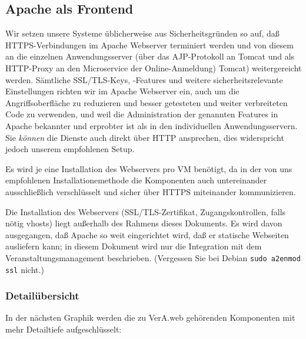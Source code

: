 \fi%

\subsection{Apache als Frontend}\label{subsec:intro-apache}

Wir setzen unsere Systeme üblicherweise aus Sicherheitsgründen so auf,
daß HTTPS-Verbindungen im Apache Webserver terminiert werden und von
diesem an die einzelnen Anwendungsserver (über das AJP-Protokoll an
\ifoa
Tomcat und als HTTP-Proxy an den Microservice der Online-Anmeldung)
\else%
Tomcat)
\fi%
weitergereicht werden. Sämtliche SSL/TLS-Keys, -Features und weitere
sicherheitsrelevante Einstellungen richten wir im Apache Webserver ein,
auch um die Angriffsoberfläche zu reduzieren und besser getesteten und
weiter verbreiteten Code zu verwenden, und weil die Administration der
genannten Features in Apache bekannter und erprobter ist als in den
individuellen Anwendungsservern. Sie \emph{können} die Dienste auch direkt
über HTTP ansprechen, dies widerspricht jedoch unserem empfohlenen Setup.

\ifoa
Es wird je eine Installation des Webservers pro VM benötigt, da in
der von uns empfohlenen Installationemethode die Komponenten auch
untereinander ausschließlich verschlüsselt und sicher über HTTPS
miteinander kommunizieren.
\fi%

Die Installation des Webservers (SSL/TLS-Zertifikat, Zugangskontrollen,
falls nötig vhosts) liegt außerhalb des Rahmens dieses Dokuments. Es
wird davon ausgegangen, daß Apache so weit eingerichtet wird, daß er
statische Webseiten ausliefern kann; in diesem Dokument wird nur die
Integration mit dem Veranstaltungsmanagement beschrieben. (Vergessen
Sie bei Debian \texttt{sudo a2enmod ssl} nicht.)

\ifoa

\subsubsection{Detailübersicht}\label{subsubsec:intro-overview-coarse}

In der nächsten Graphik werden die zu VerA.web gehörenden Komponenten
mit mehr Detailtiefe aufgeschlüsselt:\keinumbruch

